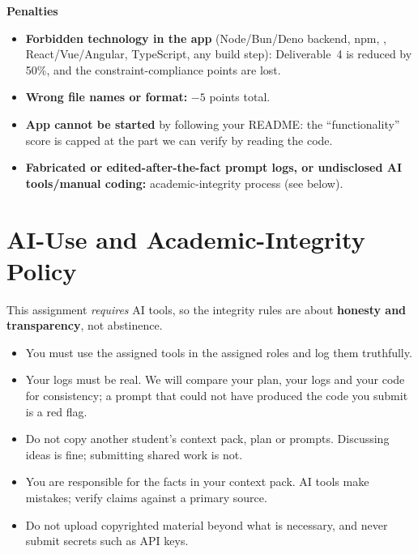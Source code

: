 \documentclass[11pt,a4paper]{article}
\newcommand{\fn}[1]{\texttt{\detokenize{#1}}}
\begin{document}
\textbf{Penalties}
\begin{itemize}
\item \textbf{Forbidden technology in the app} (Node/Bun/Deno backend, npm, \fn{package.json}, React/Vue/Angular, TypeScript, any build step): Deliverable~4 is reduced by 50\%, and the constraint-compliance points are lost.
\item \textbf{Wrong file names or format:} $-5$ points total.
\item \textbf{App cannot be started} by following your README: the ``functionality'' score is capped at the part we can verify by reading the code.
\item \textbf{Fabricated or edited-after-the-fact prompt logs, or undisclosed AI tools/manual coding:} academic-integrity process (see below).
\end{itemize}

\newpage

\section{AI-Use and Academic-Integrity Policy}
This assignment \emph{requires} AI tools, so the integrity rules are about \textbf{honesty and transparency}, not abstinence.
\begin{itemize}
\item You must use the assigned tools in the assigned roles and log them truthfully.
\item Your logs must be real. We will compare your plan, your logs and your code for consistency; a prompt that could not have produced the code you submit is a red flag.
\item Do not copy another student's context pack, plan or prompts. Discussing ideas is fine; submitting shared work is not.
\item You are responsible for the facts in your context pack. AI tools make mistakes; verify claims against a primary source.
\item Do not upload copyrighted material beyond what is necessary, and never submit secrets such as API keys.
\end{itemize}

\end{document}
